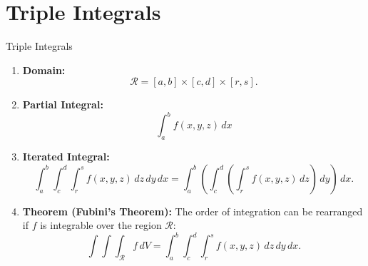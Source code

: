 \documentclass[aspectratio=169, UTF8]{beamer}
\begin{document}
\section{Triple Integrals}
\begin{frame}[label=2]{Triple Integrals}
    \begin{enumerate}
        \item \textbf{Domain:}
              $$\mathcal{R} = [a, b] \times [c, d] \times [r,s].$$

        \item \textbf{Partial Integral:}
              $$\int_a^b f(x, y, z) \, dx$$

        \item \textbf{Iterated Integral:}
              $$\int_a^b \int_c^d \int_r^s f(x, y, z) \, dz \, dy \, dx = \int_a^b \left(\int_c^d \left(\int_r^s f(x, y, z) \, dz\right) \, dy\right) \, dx.$$

        \item \textbf{Theorem (Fubini’s Theorem):} The order of integration can be rearranged if $f$ is integrable over the region $\mathcal{R}$:
              $$\int \int \int_{\mathcal{R}} f \, dV = \int_a^b \int_c^d \int_r^s f(x, y, z) \, dz \, dy \, dx.$$

    \end{enumerate}

\end{frame}
\end{document}
